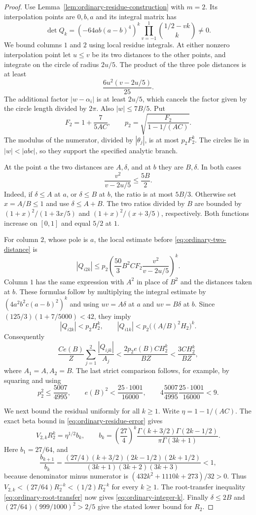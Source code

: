 \documentclass[12pt]{article}
\numberwithin{equation}{section}
\begin{document}
\begin{proof}
Use Lemma~\ref{lem:ordinary-residue-construction} with $m=2$.
Its interpolation points are $0,b,a$ and its integral matrix has
\[
 \det Q_k=(-64ab(a-b)^4)^k
           \prod_{v=-1}^{1}\binom{1/2-vk}{k}\ne0.
\]
We bound columns $1$ and $2$ using local residue integrals.
At either nonzero interpolation point let $u\le v$ be its two
distances to the other points, and integrate on the circle of radius
$2u/5$.  The product of the three pole distances is at least
\[
 \frac{6u^2(v-2u/5)}{25}.
\]
The additional factor $|w-\alpha_i|$ is at least $2u/5$, which cancels the factor given by the circle length divided by $2\pi$.  Also $|w|\le7B/5$.  Put
\[
 F_2=1+\frac7{5AC},\qquad
 p_2=\sqrt{\frac{F_2}{1-1/(AC)}}.
\]
The modulus of the numerator, divided by $|\theta_j|$, is at most
$p_2F_2^k$.  The circles lie in $|w|<|abc|$, so they support
the specified analytic branch.

At the point $a$ the two distances are $A,\delta$, and at $b$ they
are $B,\delta$.  In both cases
\begin{equation}\label{eq:ordinary-two-distance}
 \frac{v^2}{v-2u/5}\le\frac{5B}{2}.
\end{equation}
Indeed, if $\delta\le A$ at $a$, or $\delta\le B$ at $b$, the
ratio is at most $5B/3$.  Otherwise set $x=A/B\le1$ and use
$\delta\le A+B$.  The two ratios divided by $B$ are bounded by
$(1+x)^2/(1+3x/5)$ and $(1+x)^2/(x+3/5)$, respectively.
Both functions increase on $[0,1]$ and equal $5/2$ at $1$.

For column $2$, whose pole is $a$, the local estimate before
\eqref{eq:ordinary-two-distance} is
\[
 |Q_{i2k}|\le p_2
 \left(\frac{50}{3}B^2CF_2
                  \frac{v^2}{v-2u/5}\right)^k.
\]
Column $1$ has the same expression with $A^2$ in place of $B^2$
and the distances taken at $b$.  These formulas follow by multiplying
the integral estimate by $(4a^2b^2c(a-b)^2)^k$ and using $uv=A\delta$ at $a$ and $uv=B\delta$ at $b$.
Since $(125/3)(1+7/5000)<42$, they imply
\[
 |Q_{i2k}|<p_2H_2^k,\qquad
 |Q_{i1k}|<p_2\bigl((A/B)^2H_2\bigr)^k.
\]
Consequently
\[
 \frac{Ce(B)}Z\sum_{j=1}^2\frac{|Q_{ijk}|}{A_j}
 <\frac{2p_2e(B)CH_2^k}{BZ}
 <\frac{3CH_2^k}{BZ},
\]
where $A_1=A,A_2=B$.  The last strict comparison follows, for
example, by squaring and using
\[
 p_2^2\le\frac{5007}{4995},\qquad
 e(B)^2<\frac{25\cdot1001}{16000},\qquad
 4\frac{5007}{4995}\frac{25\cdot1001}{16000}<9.
\]

We next bound the residual uniformly for all $k\ge1$.  Write $\eta=1-1/(AC)$.  The exact beta bound in
\eqref{eq:ordinary-residue-error} gives
\[
 V_{2,k}R_2^k=\eta^{1/2}b_k,\qquad
 b_k=\left(\frac{27}{4}\right)^k
       \frac{\Gamma(k+3/2)\Gamma(2k-1/2)}
            {\pi\Gamma(3k+1)}.
\]
Here $b_1=27/64$, and
\[
 \frac{b_{k+1}}{b_k}=
 \frac{(27/4)(k+3/2)(2k-1/2)(2k+1/2)}
      {(3k+1)(3k+2)(3k+3)}<1,
\]
because denominator minus numerator is
$(432k^2+1110k+273)/32>0$.  Thus
$V_{2,k}<(27/64)R_2^{-k}<(1/2)R_2^{-k}$ for every $k\ge1$.
The root-transfer inequality \eqref{eq:ordinary-root-transfer} now gives \eqref{eq:ordinary-integer-k}.  Finally $\delta\le2B$ and
$(27/64)(999/1000)^2>2/5$ give the stated lower bound for $R_2$.


\end{proof}
\end{document}
